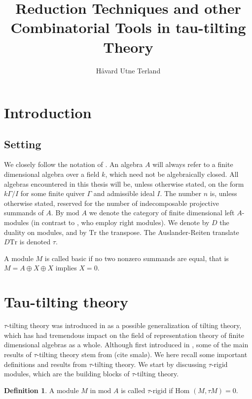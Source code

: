 \documentclass[]{article}
\title{Reduction Techniques and other Combinatorial Tools in tau-tilting Theory}
\author{Håvard Utne Terland}
\theoremstyle{definition}
\newtheorem{definition}{Definition}[section]
\newcommand{\mo}{\ensuremath{\text{mod }}}
\newcommand{\Hom}{\ensuremath{\text{Hom }}}
\begin{document}
\maketitle

\begin{abstract}

\end{abstract}

\section{Introduction}


\subsection{Setting}
We closely follow the notation of \cite{assem_skowronski_simson_2006}. An algebra $A$ will always refer to a finite dimensional algebra over a field $k$, which need not be algebraically closed. All algebras encountered in this thesis will be, unless otherwise stated, on the form $k\Gamma/I$ for some finite quiver $\Gamma$ and admissible ideal $I$. The number $n$ is, unless otherwise stated, reserved for the number of indecomposable projective summands of $A$. By $\mo A$ we denote the category of finite dimensional left $A$-modules (in contrast to \cite{assem_skowronski_simson_2006}, who employ right modules). We denote by $D$ the duality on modules, and by $\text{Tr}$ the transpose. The Auslander-Reiten translate $D\text{Tr}$ is denoted $\tau$.

A module $M$ is called basic if no two nonzero summands are equal, that is $M = A \oplus X \oplus X$ implies $X = 0$. 

\section{Tau-tilting theory}
$\tau$-tilting theory was introduced in \cite{tau} as a possible generalization of tilting theory, which has had tremendous impact on the field of representation theory of finite dimensional algebras as a whole. Although first introduced in \cite{tau}, some of the main results of $\tau$-tilting theory stem from (cite smalø). We here recall some important definitions and results from $\tau$-tilting theory. We start by discussing $\tau$-rigid modules, which are the building blocks of $\tau$-tilting theory.


\begin{definition}
	A module $M$ in $\mo A$ is called $\tau$-rigid if $\Hom(M,\tau M) = 0$.
\end{definition}
\end{document}
